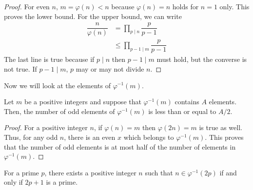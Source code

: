 \documentclass[main.tex]{subfile}
\begin{document}
		\begin{proof}
			For even $n$, $m=\varphi(n)<n$ because $\varphi(n)=n$ holds for $n=1$ only. This proves the lower bound. For the upper bound, we can write
				\begin{align*}
					\dfrac{n}{\varphi(n)} & = \prod_{p\mid n}\dfrac{p}{p-1}\\
									  & \leq \prod_{p-1\mid m}\dfrac{p}{p-1}
				\end{align*}
			The last line is true because if $p\mid n$ then $p-1\mid m$ must hold, but the converse is not true. If $p-1\mid m$, $p$ may or may not divide $n$.
		\end{proof}

	Now we will look at the elements of $\varphi^{-1}(m)$.
		\begin{theorem}
			Let $m$ be a positive integers and suppose that $\varphi^{-1}(m)$ contains $A$ elements. Then, the number of odd elements of $\varphi^{-1}(m)$ is less than or equal to $A/2$.
		\end{theorem}

		\begin{proof}
			For a positive integer $n$, if $\varphi(n)=m$ then $\varphi(2n)=m$ is true as well. Thus, for any odd $n$, there is an even $x$ which belongs to $\varphi^{-1}(m)$. This proves that the number of odd elements is at most half of the number of elements in $\varphi^{-1}(m)$.
		\end{proof}

		\begin{theorem}
			For a prime $p$, there exists a positive integer $n$ such that $n\in\varphi^{-1}(2p)$ if and only if $2p+1$ is a prime.
		\end{theorem}
\end{document}
